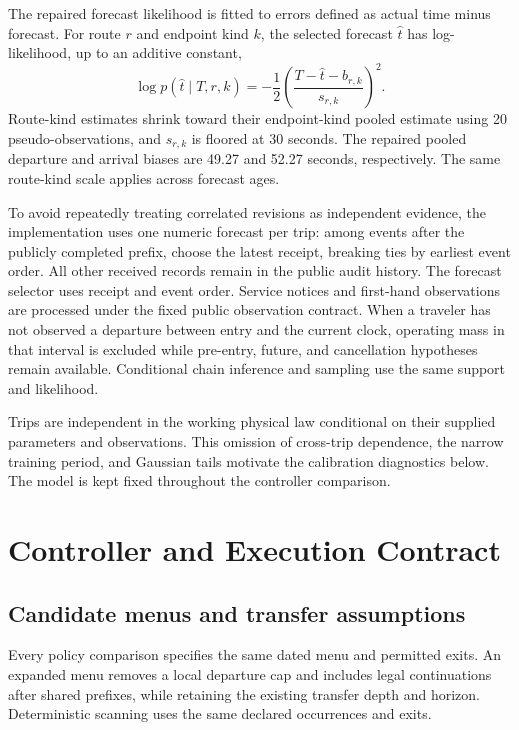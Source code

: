 \documentclass[preprint,12pt,authoryear]{elsarticle}
\begin{document}
The repaired forecast likelihood is fitted to errors defined as actual time
minus forecast. For route $r$ and endpoint kind $k$, the selected forecast
$\hat t$ has log-likelihood, up to an additive constant,
\begin{equation}
 \log p(\hat t\mid T,r,k)
 =-\frac12\left(\frac{T-\hat t-b_{r,k}}{s_{r,k}}\right)^2.
\label{eq:emission}
\end{equation}
Route-kind estimates shrink toward their endpoint-kind pooled estimate using
20 pseudo-observations, and $s_{r,k}$ is floored at 30 seconds. The repaired
pooled departure and arrival biases are 49.27 and 52.27 seconds,
respectively. The same route-kind scale applies across forecast ages.

To avoid repeatedly treating correlated revisions as independent evidence,
the implementation uses one numeric forecast per trip: among events after the
publicly completed prefix, choose the latest receipt, breaking ties by earliest
event order. All other received records remain in the public audit history.
The forecast selector uses receipt and event order.
Service notices and first-hand observations are processed under the fixed public
observation contract. When a traveler has not observed a departure between entry
and the current clock, operating mass in that interval is excluded while
pre-entry, future, and cancellation hypotheses remain available. Conditional
chain inference and sampling use the same support and likelihood.

Trips are independent in the working physical law conditional on their supplied
parameters and observations. This omission of cross-trip dependence, the narrow
training period, and Gaussian tails motivate the calibration diagnostics below.
The model is kept fixed throughout the controller comparison.

\section{Controller and Execution Contract}
\subsection{Candidate menus and transfer assumptions}
Every policy comparison specifies the same dated menu and permitted exits.
An expanded menu removes a local departure cap and includes legal continuations
after shared prefixes, while retaining the existing transfer depth and horizon.
Deterministic scanning uses the same declared occurrences and exits.
\end{document}
